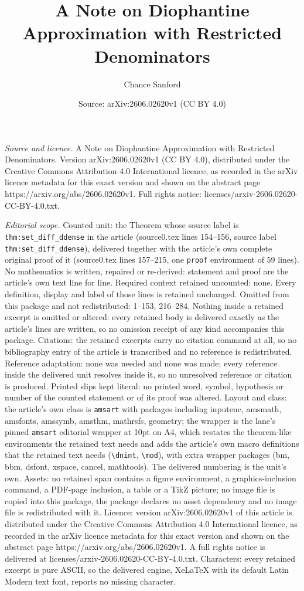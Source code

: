 \documentclass[10pt,a4paper]{amsart}
\title[A Note on Diophantine Approximation with Restricted Denomina]{A Note on Diophantine Approximation with Restricted Denominators}
\author{Chance Sanford}
\date{Source: arXiv:2606.02620v1 (CC BY 4.0)}
\begin{document}
\maketitle

\noindent\emph{Source and licence.} A Note on Diophantine Approximation with Restricted Denominators. Version arXiv:2606.02620v1 (CC BY 4.0), distributed under the Creative Commons Attribution 4.0 International licence, as recorded in the arXiv licence metadata for this exact version and shown on the abstract page https://arxiv.org/abs/2606.02620v1. Full rights notice: licenses/arxiv-2606.02620-CC-BY-4.0.txt.\par\smallskip

\noindent\textit{Editorial scope.} Counted unit: the Theorem whose source label is \texttt{thm:set\_diff\_ddense} in the article (source0.tex lines 154--156, source label \texttt{thm:set\_diff\_ddense}), delivered together with the article's own complete original proof of it (source0.tex lines 157--215, one \texttt{proof} environment of 59 lines). No mathematics is written, repaired or re-derived: statement and proof are the article's own text line for line. Required context retained uncounted: none. Every definition, display and label of those lines is retained unchanged. Omitted from this package and not redistributed: 1--153, 216--284. Nothing inside a retained excerpt is omitted or altered: every retained body is delivered exactly as the article's lines are written, so no omission receipt of any kind accompanies this package. Citations: the retained excerpts carry no citation command at all, so no bibliography entry of the article is transcribed and no reference is redistributed. Reference adaptation: none was needed and none was made; every reference inside the delivered unit resolves inside it, so no unresolved reference or citation is produced. Printed slips kept literal: no printed word, symbol, hypothesis or number of the counted statement or of its proof was altered. Layout and class: the article's own class is \texttt{amsart} with packages including inputenc, amsmath, amsfonts, amssymb, amsthm, mathrsfs, geometry; the wrapper is the lane's pinned \texttt{amsart} editorial wrapper at 10pt on A4, which restates the theorem-like environments the retained text needs and adds the article's own macro definitions that the retained text needs (\texttt{\textbackslash dnint}, \texttt{\textbackslash mod}), with extra wrapper packages (bm, bbm, dsfont, xspace, cancel, mathtools). The delivered numbering is the unit's own. Assets: no retained span contains a figure environment, a graphics-inclusion command, a PDF-page inclusion, a table or a TikZ picture; no image file is copied into this package, the package declares no asset dependency and no image file is redistributed with it. Licence: version arXiv:2606.02620v1 of this article is distributed under the Creative Commons Attribution 4.0 International licence, as recorded in the arXiv licence metadata for this exact version and shown on the abstract page https://arxiv.org/abs/2606.02620v1. A full rights notice is delivered at licenses/arxiv-2606.02620-CC-BY-4.0.txt. Characters: every retained excerpt is pure ASCII, so the delivered engine, XeLaTeX with its default Latin Modern text font, reports no missing character.
\end{document}
